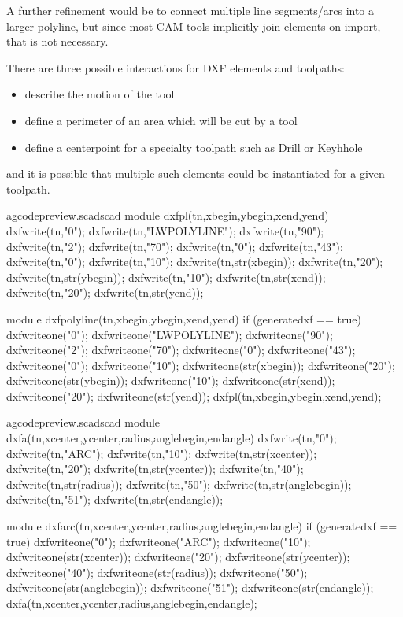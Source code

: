 \documentclass{ltxdoc}
\begin{document}
A further refinement would be to connect multiple line segments/arcs into a larger polyline, 
but since most CAM tools implicitly join elements on import, that is not necessary.
 
There are three possible interactions for DXF elements and toolpaths:

\begin{itemize}
 \item describe the motion of the tool
 \item define a perimeter of an area which will be cut by a tool
 \item define a centerpoint for a specialty toolpath such as Drill or Keyhhole
\end{itemize}
 
\noindent and it is possible that multiple such elements could be instantiated for
a given toolpath.
 
\lstset{firstnumber=\thegcpscad}
\begin{writecode}{a}{gcodepreview.scad}{scad}
module dxfpl(tn,xbegin,ybegin,xend,yend) {
    dxfwrite(tn,"0");
    dxfwrite(tn,"LWPOLYLINE");
    dxfwrite(tn,"90");
    dxfwrite(tn,"2");
    dxfwrite(tn,"70");
    dxfwrite(tn,"0");
    dxfwrite(tn,"43");
    dxfwrite(tn,"0");
    dxfwrite(tn,"10");
    dxfwrite(tn,str(xbegin));
    dxfwrite(tn,"20");
    dxfwrite(tn,str(ybegin));
    dxfwrite(tn,"10");
    dxfwrite(tn,str(xend));
    dxfwrite(tn,"20");
    dxfwrite(tn,str(yend));
}

module dxfpolyline(tn,xbegin,ybegin,xend,yend) {
if (generatedxf == true) {
    dxfwriteone("0");
    dxfwriteone("LWPOLYLINE");
    dxfwriteone("90");
    dxfwriteone("2");
    dxfwriteone("70");
    dxfwriteone("0");
    dxfwriteone("43");
    dxfwriteone("0");
    dxfwriteone("10");
    dxfwriteone(str(xbegin));
    dxfwriteone("20");
    dxfwriteone(str(ybegin));
    dxfwriteone("10");
    dxfwriteone(str(xend));
    dxfwriteone("20");
    dxfwriteone(str(yend));
    dxfpl(tn,xbegin,ybegin,xend,yend);
}
}

\end{writecode}
\addtocounter{gcpscad}{41}

\lstset{firstnumber=\thegcpscad}
\begin{writecode}{a}{gcodepreview.scad}{scad}
module dxfa(tn,xcenter,ycenter,radius,anglebegin,endangle) {
    dxfwrite(tn,"0");
    dxfwrite(tn,"ARC");
    dxfwrite(tn,"10");
    dxfwrite(tn,str(xcenter));
    dxfwrite(tn,"20");
    dxfwrite(tn,str(ycenter));
    dxfwrite(tn,"40");
    dxfwrite(tn,str(radius));
    dxfwrite(tn,"50");
    dxfwrite(tn,str(anglebegin));
    dxfwrite(tn,"51");
    dxfwrite(tn,str(endangle));
}

module dxfarc(tn,xcenter,ycenter,radius,anglebegin,endangle) {
if (generatedxf == true) {
    dxfwriteone("0");
    dxfwriteone("ARC");
    dxfwriteone("10");
    dxfwriteone(str(xcenter));
    dxfwriteone("20");
    dxfwriteone(str(ycenter));
    dxfwriteone("40");
    dxfwriteone(str(radius));
    dxfwriteone("50");
    dxfwriteone(str(anglebegin));
    dxfwriteone("51");
    dxfwriteone(str(endangle));
	dxfa(tn,xcenter,ycenter,radius,anglebegin,endangle);
}
}

\end{writecode}
\addtocounter{gcpscad}{33}
 
\end{document}
